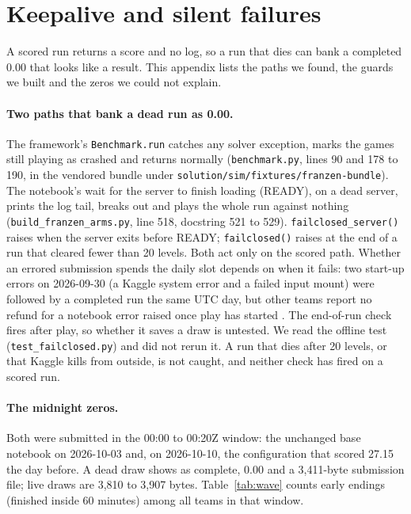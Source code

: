\section{Keepalive and silent failures}\label{app:failures}

A scored run returns a score and no log, so a run that dies can bank a completed 0.00 that looks like a result. This appendix lists the paths we found, the guards we built and the zeros we could not explain.

\paragraph{Two paths that bank a dead run as 0.00.}
The framework's \texttt{Benchmark.run} catches any solver exception, marks the games still playing as crashed and returns normally (\texttt{benchmark.py}, lines 90 and 178 to 190, in the vendored bundle under \texttt{solution/sim/fixtures/franzen-bundle}). %
The notebook's wait for the server to finish loading (READY), on a dead server, prints the log tail, breaks out and plays the whole run against nothing (\texttt{build\_franzen\_arms.py}, line 518, docstring 521 to 529). %
\texttt{failclosed\_server()} raises when the server exits before READY; \texttt{failclosed()} raises at the end of a run that cleared fewer than 20 levels. Both act only on the scored path. %
Whether an errored submission spends the daily slot depends on when it fails: two start-up errors on 2026-09-30 (a Kaggle system error and a failed input mount) were followed by a completed run the same UTC day, but other teams report no refund for a notebook error raised once play has started \citep{cottaar2026forum753843}. The end-of-run check fires after play, so whether it saves a draw is untested. %
We read the offline test (\texttt{test\_failclosed.py}) and did not rerun it. A run that dies after 20 levels, or that Kaggle kills from outside, is not caught, and neither check has fired on a scored run. %

\paragraph{The midnight zeros.}
Both were submitted in the 00:00 to 00:20Z window: the unchanged base notebook on 2026-10-03 and, on 2026-10-10, the configuration that scored 27.15 the day before. %
A dead draw shows as complete, 0.00 and a 3,411-byte submission file; live draws are 3,810 to 3,907 bytes. %
Table~\ref{tab:wave} counts early endings (finished inside 60 minutes) among all teams in that window. %


